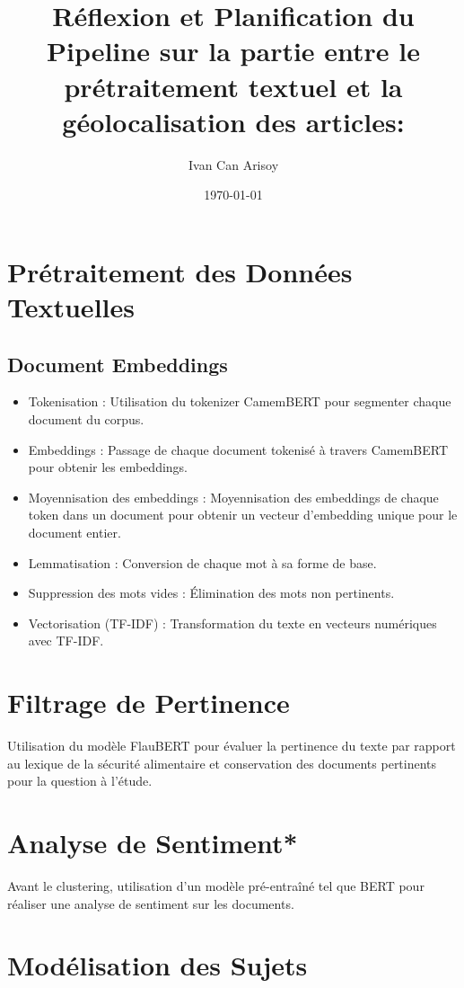 \documentclass{article}
\title{Réflexion et Planification du Pipeline sur la partie entre le prétraitement textuel et la géolocalisation des articles:}
\author{Ivan Can Arisoy}
\date{\today}
\begin{document}
\maketitle

\section{Prétraitement des Données Textuelles}

\subsection{Document Embeddings}
\begin{itemize}
  \item Tokenisation : Utilisation du tokenizer CamemBERT pour segmenter chaque document du corpus.
  \item Embeddings : Passage de chaque document tokenisé à travers CamemBERT pour obtenir les embeddings.
  \item Moyennisation des embeddings : Moyennisation des embeddings de chaque token dans un document pour obtenir un vecteur d'embedding unique pour le document entier.
  \item Lemmatisation : Conversion de chaque mot à sa forme de base.
  \item Suppression des mots vides : Élimination des mots non pertinents.
  \item Vectorisation (TF-IDF) : Transformation du texte en vecteurs numériques avec TF-IDF.
\end{itemize}

\section{Filtrage de Pertinence}

Utilisation du modèle FlauBERT pour évaluer la pertinence du texte par rapport au lexique de la sécurité alimentaire et conservation des documents pertinents pour la question à l'étude.

\section{Analyse de Sentiment*}

Avant le clustering, utilisation d'un modèle pré-entraîné tel que BERT pour réaliser une analyse de sentiment sur les documents.

\section{Modélisation des Sujets}
\end{document}
